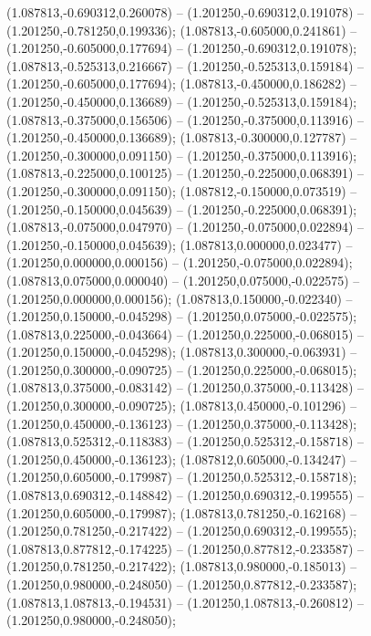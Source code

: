  (1.087813,-0.690312,0.260078) -- (1.201250,-0.690312,0.191078) -- (1.201250,-0.781250,0.199336);
 (1.087813,-0.605000,0.241861) -- (1.201250,-0.605000,0.177694) -- (1.201250,-0.690312,0.191078);
 (1.087813,-0.525313,0.216667) -- (1.201250,-0.525313,0.159184) -- (1.201250,-0.605000,0.177694);
 (1.087813,-0.450000,0.186282) -- (1.201250,-0.450000,0.136689) -- (1.201250,-0.525313,0.159184);
 (1.087813,-0.375000,0.156506) -- (1.201250,-0.375000,0.113916) -- (1.201250,-0.450000,0.136689);
 (1.087813,-0.300000,0.127787) -- (1.201250,-0.300000,0.091150) -- (1.201250,-0.375000,0.113916);
 (1.087813,-0.225000,0.100125) -- (1.201250,-0.225000,0.068391) -- (1.201250,-0.300000,0.091150);
 (1.087812,-0.150000,0.073519) -- (1.201250,-0.150000,0.045639) -- (1.201250,-0.225000,0.068391);
 (1.087813,-0.075000,0.047970) -- (1.201250,-0.075000,0.022894) -- (1.201250,-0.150000,0.045639);
 (1.087813,0.000000,0.023477) -- (1.201250,0.000000,0.000156) -- (1.201250,-0.075000,0.022894);
 (1.087813,0.075000,0.000040) -- (1.201250,0.075000,-0.022575) -- (1.201250,0.000000,0.000156);
 (1.087813,0.150000,-0.022340) -- (1.201250,0.150000,-0.045298) -- (1.201250,0.075000,-0.022575);
 (1.087813,0.225000,-0.043664) -- (1.201250,0.225000,-0.068015) -- (1.201250,0.150000,-0.045298);
 (1.087813,0.300000,-0.063931) -- (1.201250,0.300000,-0.090725) -- (1.201250,0.225000,-0.068015);
 (1.087813,0.375000,-0.083142) -- (1.201250,0.375000,-0.113428) -- (1.201250,0.300000,-0.090725);
 (1.087813,0.450000,-0.101296) -- (1.201250,0.450000,-0.136123) -- (1.201250,0.375000,-0.113428);
 (1.087813,0.525312,-0.118383) -- (1.201250,0.525312,-0.158718) -- (1.201250,0.450000,-0.136123);
 (1.087812,0.605000,-0.134247) -- (1.201250,0.605000,-0.179987) -- (1.201250,0.525312,-0.158718);
 (1.087813,0.690312,-0.148842) -- (1.201250,0.690312,-0.199555) -- (1.201250,0.605000,-0.179987);
 (1.087813,0.781250,-0.162168) -- (1.201250,0.781250,-0.217422) -- (1.201250,0.690312,-0.199555);
 (1.087813,0.877812,-0.174225) -- (1.201250,0.877812,-0.233587) -- (1.201250,0.781250,-0.217422);
 (1.087813,0.980000,-0.185013) -- (1.201250,0.980000,-0.248050) -- (1.201250,0.877812,-0.233587);
 (1.087813,1.087813,-0.194531) -- (1.201250,1.087813,-0.260812) -- (1.201250,0.980000,-0.248050);
